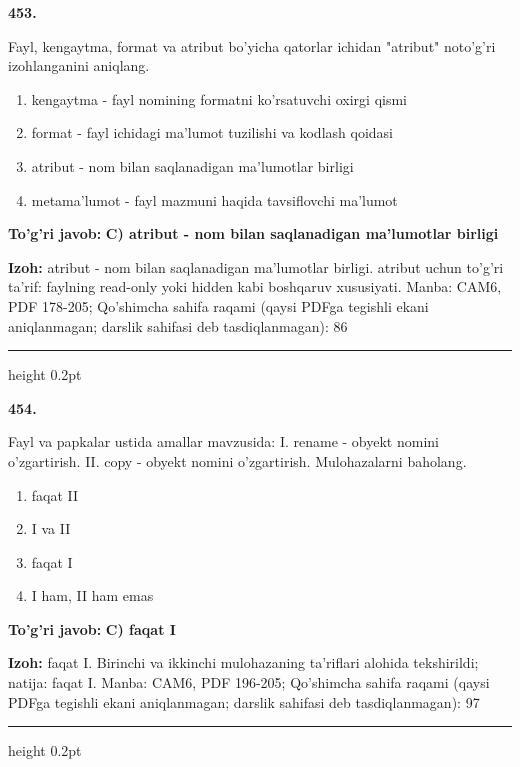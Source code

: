 \documentclass[10pt,a4paper]{article}
\begin{document}
{\bfseries\sffamily\color{ink} 453.}
\par
Fayl, kengaytma, format va atribut bo'yicha qatorlar ichidan "atribut" noto'g'ri izohlanganini aniqlang.
\begin{enumerate}[label=\Alph*),leftmargin=9mm]
\item kengaytma - fayl nomining formatni ko'rsatuvchi oxirgi qismi
\item format - fayl ichidagi ma'lumot tuzilishi va kodlash qoidasi
\item atribut - nom bilan saqlanadigan ma'lumotlar birligi
\item metama'lumot - fayl mazmuni haqida tavsiflovchi ma'lumot
\end{enumerate}
\begin{tcolorbox}[enhanced,breakable,colback=teal!4,colframe=teal!60!black,boxrule=0.45pt,arc=1.2mm,left=2.7mm,right=2.7mm,top=1.8mm,bottom=1.8mm,before skip=2mm,after skip=2mm]
{\bfseries\sffamily\color{teal}To'g'ri javob:} \textbf{C) atribut - nom bilan saqlanadigan ma'lumotlar birligi}
\par\smallskip
{\bfseries Izoh:} atribut - nom bilan saqlanadigan ma'lumotlar birligi. atribut uchun to'g'ri ta'rif: faylning read-only yoki hidden kabi boshqaruv xususiyati. Manba: CAM6, PDF 178-205; Qo'shimcha sahifa raqami (qaysi PDFga tegishli ekani aniqlanmagan; darslik sahifasi deb tasdiqlanmagan): 86
\end{tcolorbox}
\vspace{2mm}\hrule height 0.2pt\vspace{3mm}

{\bfseries\sffamily\color{ink} 454.}
\par
Fayl va papkalar ustida amallar mavzusida: I. rename - obyekt nomini o'zgartirish. II. copy - obyekt nomini o'zgartirish. Mulohazalarni baholang.
\begin{enumerate}[label=\Alph*),leftmargin=9mm]
\item faqat II
\item I va II
\item faqat I
\item I ham, II ham emas
\end{enumerate}
\begin{tcolorbox}[enhanced,breakable,colback=teal!4,colframe=teal!60!black,boxrule=0.45pt,arc=1.2mm,left=2.7mm,right=2.7mm,top=1.8mm,bottom=1.8mm,before skip=2mm,after skip=2mm]
{\bfseries\sffamily\color{teal}To'g'ri javob:} \textbf{C) faqat I}
\par\smallskip
{\bfseries Izoh:} faqat I. Birinchi va ikkinchi mulohazaning ta'riflari alohida tekshirildi; natija: faqat I. Manba: CAM6, PDF 196-205; Qo'shimcha sahifa raqami (qaysi PDFga tegishli ekani aniqlanmagan; darslik sahifasi deb tasdiqlanmagan): 97
\end{tcolorbox}
\vspace{2mm}\hrule height 0.2pt\vspace{3mm}
\end{document}
